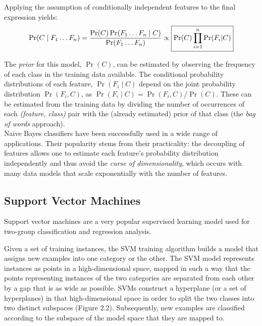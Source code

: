 \documentclass[12pt,twoside,notitlepage,amsart]{report} %
\begin{document}
 Applying the assumption of conditionally independent features to the final expression yields:
	\begin{equation}
	\displaystyle \Pr(C\mid{F_{1} \ldots F_{n}}) = { \Pr(C) \Pr(F_1 \ldots F_n \mid C) \over \Pr(F_1 \ldots F_n) } \propto \boxed{\Pr(C) \prod\limits_{i=1}^n \Pr(F_i|C)}  \end{equation} 
	
	The \emph{prior} for this model, $\Pr(C)$, can be estimated by observing the frequency of each class in the training data available. The conditional probability distributions of each feature, $\Pr(F_i \mid C)$ depend on the joint probability distribution $\Pr(F_i, C)$, as $\Pr(F_i \mid C) = \Pr(F_i, C) / \Pr(C)$. These can be estimated from the training data by dividing the number of occurrences of each \emph{(feature, class)} pair with the (already estimated) prior of that class (the \emph{bag of words} approach). \\
	
	Naive Bayes classifiers have been successfully used in a wide range of applications. Their popularity stems from their practicality: the decoupling of features allows one to estimate each feature's probability distribution independently and thus avoid the \emph{curse of dimensionality}, which occurs with many data models that scale exponentially with the number of features. 
 

	\subsection{Support Vector Machines}
		
	Support vector machines are a very popular supervised learning model used for two-group classification and regression analysis. \cite{Vapnik95}
	
	Given a set of training instances, the {SVM} training algorithm builds a model that assigns new examples into one category or the other. The {SVM} model represents instances as points in a high-dimensional space, mapped in such a way that the points representing instances of the two categories are separated from each other by a gap that is as wide as possible. {SVMs} construct a hyperplane (or a set of hyperplanes) in that high-dimensional space in order to split the two classes into two distinct subspaces (Figure 2.2). Subsequently, new examples are classified according to the subspace of the model space that they are mapped to. 
	
\end{document}
